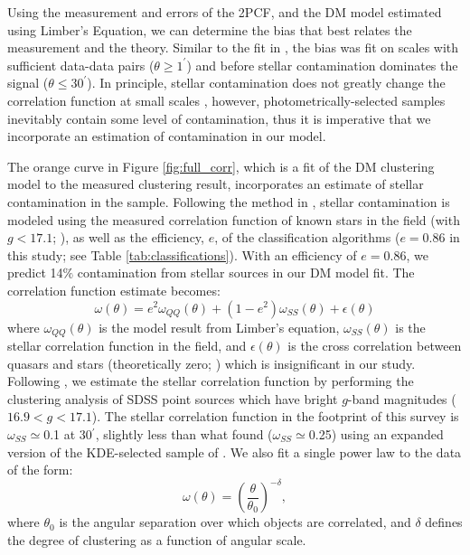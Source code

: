 \documentclass[apj, numberedappendix]{emulateapj}
\begin{document}
Using the measurement and errors of the 2PCF, and the DM model estimated using Limber's Equation, we can determine the bias that best relates the measurement and the theory. Similar to the fit in \citet{Myers2007}, the bias was fit on scales with sufficient data-data pairs ($\theta \geq 1^\prime$) and before stellar contamination dominates the signal ($\theta \leq 30^\prime$). In principle, stellar contamination does not greatly change the correlation function at small scales \citep{Myers2006}, however, photometrically-selected samples inevitably contain some level of contamination, thus it is imperative that we incorporate an estimation of  contamination in our model.

The orange curve in Figure \ref{fig:full_corr}, which is a fit of the DM clustering model to the measured clustering result, incorporates an estimate of stellar contamination in the sample. Following the method in \citet{Myers2006}, stellar contamination is modeled using the measured correlation function of known stars in the field (with $g < 17.1$; \citealt{Myers2006}), as well as the efficiency, $e$, of the classification algorithms ($e=$0.86 in this study; see Table \ref{tab:classifications}). With an efficiency of $e = 0.86$, we predict 14$\%$ contamination from stellar sources in our DM model fit. The correlation function estimate becomes:
\begin{equation}\label{stcontam_fit}
\omega(\theta) = e^2 \omega_{QQ}(\theta) + (1-e^2)\omega_{SS}(\theta) + \epsilon(\theta)
\end{equation}
where $\omega_{QQ}(\theta)$ is the model result from Limber's equation, $\omega_{SS}(\theta)$ is the stellar correlation function in the field, and $\epsilon(\theta)$ is the cross correlation between quasars and stars (theoretically zero; \citealt{Myers2007}) which is insignificant in our study. Following \citet{Myers2006}, we estimate the stellar correlation function by performing the clustering analysis of SDSS point sources which have bright $g$-band magnitudes ($16.9< g <17.1$). The stellar correlation function in the footprint of this survey is $\omega_{SS} \simeq $0.1 at 30$^\prime$, slightly less than what \citet{Myers2006} found ($\omega_{SS} \simeq $0.25) using an expanded version of the KDE-selected sample of \citet{Richards2004}. We also fit a single power law to the data of the form:
\begin{equation}\label{eqn:2dpowerlaw}
\omega(\theta) = \left(\frac{\theta}{\theta_0}\right)^{-\delta},
\end{equation}
where $\theta_0$ is the angular separation over which objects are correlated, and $\delta$ defines the degree of clustering as a function of angular scale.  
\end{document}
